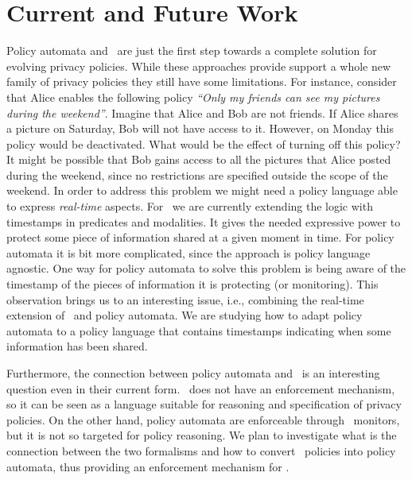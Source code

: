 \vspace{-4mm}
\section{Current and Future Work}

Policy automata and \tfppf~are just the first step towards a complete solution for evolving privacy policies. While these approaches provide support a whole new family of privacy policies they still have some limitations. For instance, consider that Alice enables the following policy \emph{``Only my friends can see my pictures during the weekend''}. Imagine that Alice and Bob are not friends. If Alice shares a picture on Saturday, Bob will not have access to it. However, on Monday this policy would be deactivated. What would be the effect of turning off this policy? It might be possible that Bob gains access to all the pictures that Alice posted during the weekend, since no restrictions are specified outside the scope of the weekend. In order to address this problem we might need a policy language able to express {\it real-time} aspects. For \tfppf~we are currently extending the logic with timestamps in predicates and modalities. It gives the needed expressive power to protect some piece of information shared at a given moment in time. For policy automata it is bit more complicated, since the approach is policy language agnostic. One way for policy automata to solve this problem is being aware of the timestamp of the pieces of information it is protecting (or monitoring). This observation brings us to an interesting issue, i.e., combining the real-time extension of \tfppf~and policy automata. We are studying how to adapt policy automata to a policy language that contains timestamps indicating when some information has been shared.

Furthermore, the connection between policy automata and \tfppf~is an interesting question even in their current form. \tfppf~does not have an enforcement mechanism, so it can be seen as a language suitable for reasoning and specification of privacy policies. On the other hand, policy automata are enforceable through \larva~monitors, but it is not so targeted for policy reasoning. We plan to investigate what is the connection between the two formalisms and how to convert \tfppf~policies into policy automata, thus providing an enforcement mechanism for \tfppf.
\vspace{-4mm}

